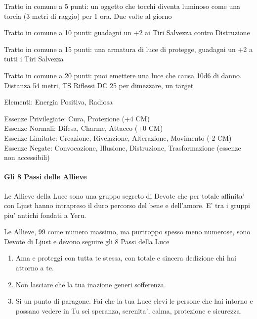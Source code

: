 \documentclass[a4paper,11pt,twoside,openany]{book}
\begin{document}
{		\bigskip
		
		Tratto in comune a 5 punti: un oggetto che tocchi diventa luminoso come una torcia (3 metri di raggio) per 1 ora. Due volte al giorno
		
		Tratto in comune a 10 punti: guadagni un +2 ai Tiri Salvezza contro Distruzione
		
		Tratto in comune a 15 punti: una armatura di luce di protegge, guadagni un +2 a tutti i Tiri Salvezza
		
		Tratto in comune a 20 punti: puoi emettere una luce che causa 10d6 di danno. Distanza 54 metri, TS Riflessi DC 25 per dimezzare, un target
		
		\bigskip
		
		Elementi: Energia Positiva, Radiosa
		
		\bigskip
		
		Essenze Privilegiate: Cura, Protezione (+4 CM)\\
		Essenze Normali: Difesa, Charme, Attacco (+0 CM)\\
		Essenze Limitate: Creazione, Rivelazione, Alterazione, Movimento (-2 CM)
		Essenze Negate: Convocazione, Illusione, Distruzione, Trasformazione (essenze non accessibili)
		
		\paragraph{Gli 8 Passi delle Allieve}
		
		\label{gli-8-passi-delle-allieve}
		
		Le Allieve della Luce sono una gruppo segreto di Devote che per totale affinita' con Ljust hanno intrapreso il duro percorso del bene e dell'amore. E' tra i gruppi piu' antichi fondati a Yeru.
		
		Le Allieve, 99 come numero massimo, ma purtroppo spesso meno numerose, sono Devote di Ljust e devono seguire gli 8 Passi della Luce
		
		\begin{enumerate}
			\item Ama e proteggi con tutta te stessa, con totale e sincera dedizione chi hai attorno a te.
			
			\item Non lasciare che la tua inazione generi sofferenza.
			
			\item Si un punto di paragone. Fai che la tua Luce elevi le persone che hai intorno e possano vedere in Tu sei speranza, serenita', calma, protezione e sicurezza.
			

\end{enumerate}}
\end{document}
